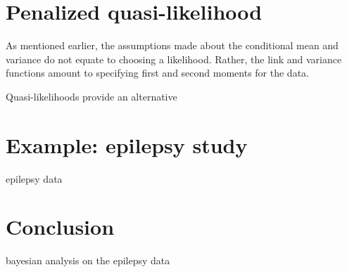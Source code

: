 \documentclass[12pt]{article}
\begin{document}
\section{Penalized quasi-likelihood}

\noindent As mentioned earlier, the assumptions made about the conditional mean and variance do not equate to choosing a likelihood. Rather, the link and variance functions amount to specifying first and second moments for the data.

Quasi-likelihoods \citep{wedderburn:1974} provide an alternative 

\section{Example: epilepsy study}

epilepsy data \cite{thall:1990}

\section{Conclusion}

bayesian analysis on the epilepsy data \cite{fong:2009}



\end{document}

